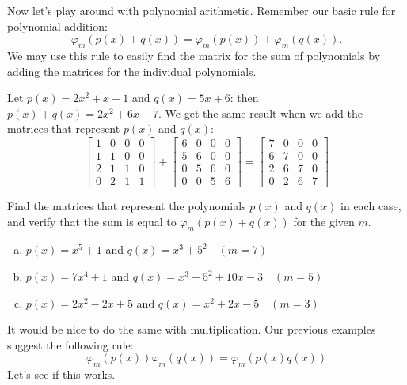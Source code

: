 Now let's play around with polynomial arithmetic. Remember our basic rule for polynomial addition:
\[
\varphi_m( p(x) + q(x)) = \varphi_m( p(x)) +\varphi_m(q(x)). \]
We may use this rule to easily find  the matrix for the sum of polynomials by adding the matrices for the individual polynomials.

\begin{example}{}
Let $p(x)=2x^2+x+1$ and $q(x)=5x+6$: then $p(x)+q(x)=2x^2+6x+7$. We get the same result when we add the matrices that represent $p(x)$ and $q(x)$:\\
\[\left[\begin{array}{cccc}1 & 0 & 0 & 0\\1 & 1 & 0 & 0\\2 & 1 & 1 & 0\\0 & 2 & 1 & 1\end{array}\right]+\left[\begin{array}{cccc}6 & 0 & 0 & 0\\5 & 6 & 0 & 0\\0 & 5 & 6 & 0\\0 & 0 & 5 & 6\end{array}\right]=\left[\begin{array}{cccc}7 & 0 & 0 & 0\\6 & 7 & 0 & 0\\2 & 6 & 7 & 0\\0 & 2 & 6 & 7\end{array}\right]\]
\end{example}

\begin{exercise}{}
Find the matrices that represent the polynomials $p(x)$ and $q(x)$ in each case, and verify that the sum is equal to  $\varphi_m(p(x)+q(x))$ for the given $m$.
	\begin{enumerate}[(a)]
		\item
		$p(x)=x^5+1$ and $q(x)=x^3+5^2 \quad (m=7)$
		\item
		$p(x)=7x^4+1$ and $q(x)=x^3+5^2+10x-3 \quad (m=5)$
		\item
		$p(x)=2x^2-2x+5$ and $q(x)=x^2+2x-5 \quad(m=3)$
	\end{enumerate}
\end{exercise}

It would be nice to do the same with multiplication. Our previous examples suggest the following rule:
\[
\varphi_m( p(x))\varphi_m(q(x))=\varphi_m( p(x)q(x)) 
\]
Let's see if this works.\\

